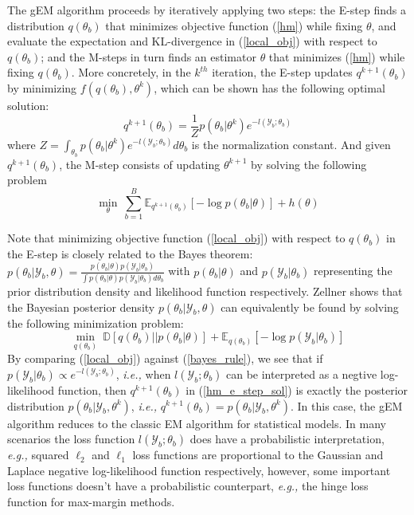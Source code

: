 \documentclass{article}
\newcommand{\ie}[0]{\emph{i.e., }}
\newcommand{\eg}[0]{\emph{e.g., }}
\newcommand{\1}[0]{\ensuremath{\boldsymbol{1}}\xspace}
\begin{document}
The gEM algorithm proceeds by iteratively applying two steps: the E-step finds a distribution $q(\theta_b)$ that minimizes objective function (\ref{hm}) while fixing $\theta$, and evaluate the expectation and KL-divergence in (\ref{local_obj}) with respect to $q(\theta_b)$; and the M-steps in turn finds an estimator $\theta$ that minimizes (\ref{hm}) while fixing $q(\theta_b)$. More concretely, in the $k^{th}$ iteration, the E-step updates $q^{k+1}(\theta_b)$ by minimizing $f(q(\theta_b), \theta^k)$, which can be shown has the following optimal solution: 
\begin{equation}\label{hm_e_step_sol}
\textstyle q^{k+1}(\theta_b) = \frac{1}{Z}p(\theta_b|\theta^k)e^{-l(\mathcal{Y}_b; \theta_b)}
\end{equation}
where $Z = \int_{\theta_b}p(\theta_b|\theta^k)e^{-l(\mathcal{Y}_b; \theta_b)}d\theta_b$ is the normalization constant.  And given $q^{k+1}(\theta_b)$, the M-step consists of updating $\theta^{k+1}$ by solving the following problem
\begin{equation}\label{hm_m_step}
\textstyle\min_{\theta}~\sum_{b=1}^B\mathbb{E}_{q^{k+1}(\theta_b)}[-\log p(\theta_b|\theta)] + h(\theta)
\end{equation}

Note that minimizing objective function (\ref{local_obj}) with respect to $q(\theta_b)$ in the E-step is closely related to the Bayes theorem: $p(\theta_b|\mathcal{Y}_b, \theta) = \frac{p(\theta_b|\theta)p(\mathcal{Y}_b|\theta_b)}{\int p(\theta_b|\theta)p(\mathcal{Y}_b|\theta_b)d\theta_b}$ with $p(\theta_b|\theta)$ and $p(\mathcal{Y}_b|\theta_b)$ representing the prior distribution density and likelihood function respectively. Zellner  shows that the Bayesian posterior density $p(\theta_b|\mathcal{Y}_b, \theta)$ can equivalently be found by solving the following minimization problem:
\begin{equation}\label{bayes_rule}
\textstyle \min_{q(\theta_b)} ~\mathbb{D}[q(\theta_b)||p(\theta_b|\theta)] + \mathbb{E}_{q(\theta_b)}[-\log p(\mathcal{Y}_b|\theta_b)]
\end{equation}
By comparing (\ref{local_obj}) against (\ref{bayes_rule}), we see that if $p(\mathcal{Y}_b|\theta_b) \propto e^{-l(\mathcal{Y}_b; \theta_b)}$, \ie when $l(\mathcal{Y}_b; \theta_b)$ can be interpreted as a negtive log-likelihood function, then $q^{k+1}(\theta_b)$ in (\ref{hm_e_step_sol}) is exactly the posterior distribution $p(\theta_b|\mathcal{Y}_b, \theta^k)$, \ie $q^{k+1}(\theta_b) = p(\theta_b|\mathcal{Y}_b, \theta^k)$. In this case, the gEM algorithm reduces to the classic EM algorithm for statistical models. In many scenarios the loss function $l(\mathcal{Y}_b; \theta_b)$ does have a probabilistic interpretation, \eg  squared $\ell_2$ and $\ell_1$ loss functions are proportional to the  Gaussian and Laplace negative log-likelihood function respectively, however, some important loss functions doesn't have a probabilistic counterpart, \eg the hinge loss function for max-margin methods.
\end{document}
